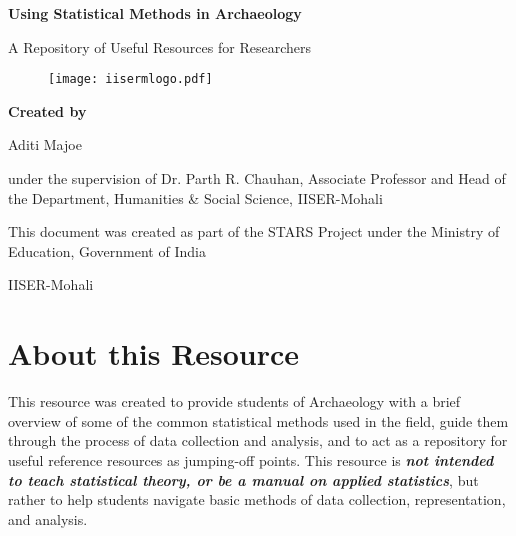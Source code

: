 \documentclass{article}
\begin{document}
\sloppy

\begin{titlepage}
    \vspace*{\fill}
    \centering
    {\bfseries\fontsize{18}{18}\selectfont Using Statistical Methods in Archaeology \par}
    \vspace{1cm}
    {\fontsize{14}{14}\selectfont A Repository of Useful Resources for Researchers\par}
    \vspace{1cm}
    \begin{figure}[hbt!]
        \centering
        \texttt{[image: iisermlogo.pdf]}
    \end{figure}
    \vspace{1cm}
    {\bfseries\fontsize{14}{14}\selectfont Created by\par}
    \vspace{0.25cm}
    {\fontsize{14}{14}\selectfont Aditi Majoe\par}
    \vspace{0.25cm}
    {\fontsize{14}{14}\selectfont under the supervision of Dr. Parth R. Chauhan, Associate Professor and Head of the Department, Humanities \& Social Science, IISER-Mohali\par}

    \vspace{2cm}
    {\fontsize{12}{12}\selectfont This document was created as part of the STARS Project under the Ministry of Education, Government of India\par}
    \vspace{0.25cm}
    {\fontsize{12}{12}\selectfont IISER-Mohali\par}
    \vspace{0.25cm}
    {\fontsize{14}{14}\par}
    \vspace*{\fill}
\end{titlepage}

\tableofcontents
{}

\newpage
\section{About this Resource}

This resource was created to provide students of Archaeology with a brief overview of some of the common statistical methods used in the field, guide them through the process of data collection and analysis, and to act as a repository for useful reference resources as jumping-off points. 
This resource is \textit{\textbf{not intended to teach statistical theory, or be a manual on applied statistics}}, but rather to help students navigate basic methods of data collection, representation, and analysis. 
\end{document}
